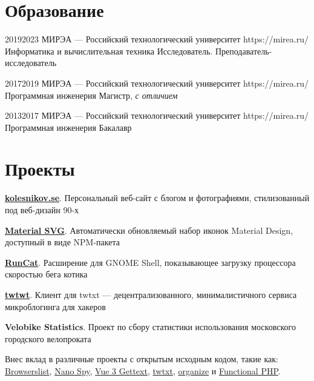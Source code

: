 \documentclass[10pt]{article}
\begin{document}

\section{Образование}

\education
	{2019}{2023}
	{МИРЭА --- Российский технологический университет}
	{https://mirea.ru/}
	{Информатика и вычислительная техника}
	{Исследователь. Преподаватель-исследователь}

\education
	{2017}{2019}
	{МИРЭА --- Российский технологический университет}
	{https://mirea.ru/}
	{Программная инженерия}
	{Магистр, \textit{с отличием}}

\education
	{2013}{2017}
	{МИРЭА --- Российский технологический университет}
	{https://mirea.ru/}
	{Программная инженерия}
	{Бакалавр}


\section{Проекты}

\begin{compactitemize}
	\item \textbf{\href{https://kolesnikov.se/}{kolesnikov.se}}. Персональный веб-сайт с блогом и фотографиями, стилизованный под веб-дизайн 90-х
	\item \textbf{\href{https://github.com/cloudblue/material-svg}{Material SVG}}. Автоматически обновляемый набор иконок Material Design, доступный в виде NPM-пакета
	\item \textbf{\href{https://github.com/win0err/gnome-runcat}{RunCat}}. Расширение для GNOME Shell, показывающее загрузку процессора скоростью бега котика
	\item \textbf{\href{https://github.com/win0err/twtwt}{twtwt}}. Клиент для twtxt --- децентрализованного, минималистичного сервиса микроблогинга для хакеров
	\item \textbf{Velobike Statistics}. Проект по сбору статистики использования московского городского велопроката
\end{compactitemize}

Внес вклад в различные проекты с открытым исходным кодом, такие как:
\href{https://github.com/browserslist/browserslist/pulls?q=author:win0err}{Browserslist},
\href{https://github.com/ai/nanospy/pulls?q=author:win0err}{Nano Spy},
\href{https://github.com/jshmrtn/vue3-gettext/pulls?q=author:win0err}{Vue 3 Gettext},
\href{https://github.com/buckket/twtxt/pulls?q=author:win0err}{twtxt},
\href{https://github.com/tfeldmann/organize/pulls?q=author:win0err}{organize} и \href{https://github.com/lstrojny/functional-php/pulls?q=author:win0err}{Functional PHP}.
\end{document}
